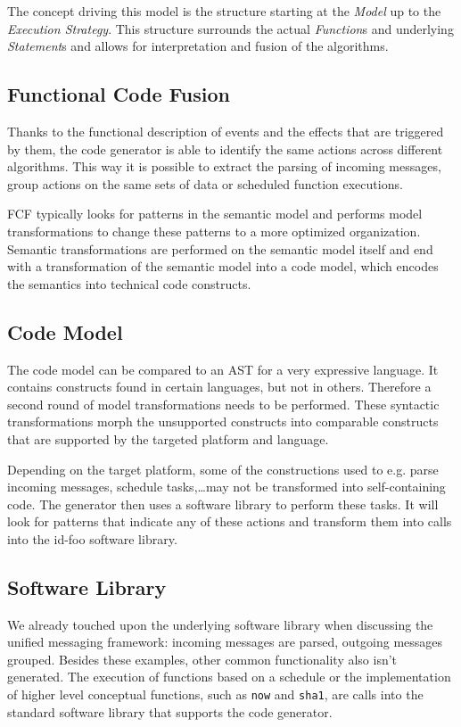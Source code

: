 \documentclass[conference]{IEEEtran}
\newcommand{\NAME}{id-foo\xspace}
\begin{document}
The concept driving this model is the structure starting at the \emph{Model} up
to the \emph{Execution Strategy}. This structure surrounds the actual
\emph{Function}s and underlying \emph{Statement}s and allows for interpretation
and fusion of the algorithms.

\subsection*{Functional Code Fusion}

Thanks to the functional description of events and the effects that are
triggered by them, the code generator is able to identify the same actions
across different algorithms. This way it is possible to extract the parsing of
incoming messages, group actions on the same sets of data or scheduled function
executions.

FCF typically looks for patterns in the semantic model and performs model
transformations to change these patterns to a more optimized organization.
Semantic transformations are performed on the semantic model itself and end
with a transformation of the semantic model into a code model, which encodes
the semantics into technical code constructs.

\subsection*{Code Model}

The code model can be compared to an AST for a very expressive language. It
contains constructs found in certain languages, but not in others. Therefore a
second round of model transformations needs to be performed. These syntactic
transformations morph the unsupported constructs into comparable constructs
that are supported by the targeted platform and language.

Depending on the target platform, some of the constructions used to e.g. parse
incoming messages, schedule tasks,\dots may not be transformed into
self-containing code. The generator then uses a software library to perform
these tasks. It will look for patterns that indicate any of these actions and
transform them into calls into the \NAME software library.

\subsection*{Software Library}

We already touched upon the underlying software library when discussing the
unified messaging framework: incoming messages are parsed, outgoing messages
grouped. Besides these examples, other common functionality also isn't
generated. The execution of functions based on a schedule or the implementation
of higher level conceptual functions, such as \texttt{now} and \texttt{sha1},
are calls into the standard software library that supports the code generator.
\end{document}
